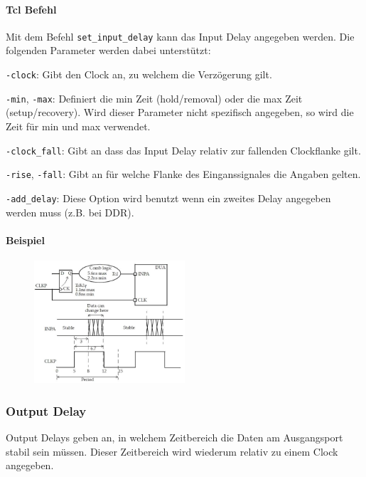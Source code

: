 \paragraph{Tcl Befehl}
Mit dem Befehl \texttt{set\_input\_delay} kann das Input Delay angegeben werden. Die folgenden Parameter werden dabei unterstützt:
\begin{compactitem}
    \item \texttt{-clock}: Gibt den Clock an, zu welchem die Verzögerung gilt.
    \item \texttt{-min}, \texttt{-max}: Definiert die min Zeit (hold/removal) oder die max Zeit (setup/recovery). Wird dieser Parameter nicht spezifisch angegeben, so wird die Zeit für min und max verwendet.
    \item \texttt{-clock\_fall}: Gibt an dass das Input Delay relativ zur fallenden Clockflanke gilt.
    \item \texttt{-rise}, \texttt{-fall}: Gibt an für welche Flanke des Einganssignales die Angaben gelten.
    \item \texttt{-add\_delay}: Diese Option wird benutzt wenn ein zweites Delay angegeben werden muss (z.B. bei DDR).
\end{compactitem}

\paragraph{Beispiel}
\begin{figure}[H]
    \includegraphics[width=0.5\textwidth]{images/input_delay.png}
\end{figure}


\subsubsection{Output Delay} \label{chapter:output_delay}
Output Delays geben an, in welchem Zeitbereich die Daten am Ausgangsport stabil sein müssen. Dieser Zeitbereich wird wiederum relativ zu einem Clock angegeben.


